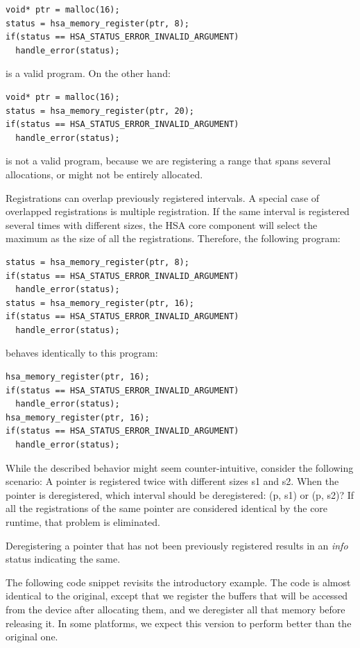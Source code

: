 \documentclass[final]{book}
\begin{document}
\begin{lstlisting}
void* ptr = malloc(16);
status = hsa_memory_register(ptr, 8);
if(status == HSA_STATUS_ERROR_INVALID_ARGUMENT)
  handle_error(status);
\end{lstlisting}

is a valid program. On the other hand:

\begin{lstlisting}
void* ptr = malloc(16);
status = hsa_memory_register(ptr, 20);
if(status == HSA_STATUS_ERROR_INVALID_ARGUMENT)
  handle_error(status);
\end{lstlisting}

is not a valid program, because we are registering a range that spans several
allocations, or might not be entirely allocated.

Registrations can overlap previously registered intervals. A special case of
overlapped registrations is multiple registration. If the same interval is
registered several times with different sizes, the HSA core component will
select the maximum as the size of all the registrations. Therefore, the
following program:

\begin{lstlisting}
status = hsa_memory_register(ptr, 8);
if(status == HSA_STATUS_ERROR_INVALID_ARGUMENT)
  handle_error(status);
status = hsa_memory_register(ptr, 16);
if(status == HSA_STATUS_ERROR_INVALID_ARGUMENT)
  handle_error(status);
\end{lstlisting}

behaves identically to this program:

\begin{lstlisting}
hsa_memory_register(ptr, 16);
if(status == HSA_STATUS_ERROR_INVALID_ARGUMENT)
  handle_error(status);
hsa_memory_register(ptr, 16);
if(status == HSA_STATUS_ERROR_INVALID_ARGUMENT)
  handle_error(status);
\end{lstlisting}

While the described behavior might seem counter-intuitive, consider the
following scenario: A pointer is registered twice with different sizes s1 and
s2. When the pointer is deregistered, which interval should be deregistered: (p,
s1) or (p, s2)? If all the registrations of the same pointer are considered
identical by the core runtime, that problem is eliminated.

Deregistering a pointer that has not been previously registered results in an
\emph{info} status indicating the same.

The following code snippet revisits the introductory example. The code is almost
identical to the original, except that we register the buffers that will be
accessed from the device after allocating them, and we deregister all that
memory before releasing it. In some platforms, we expect this version to perform
better than the original one.
\end{document}
